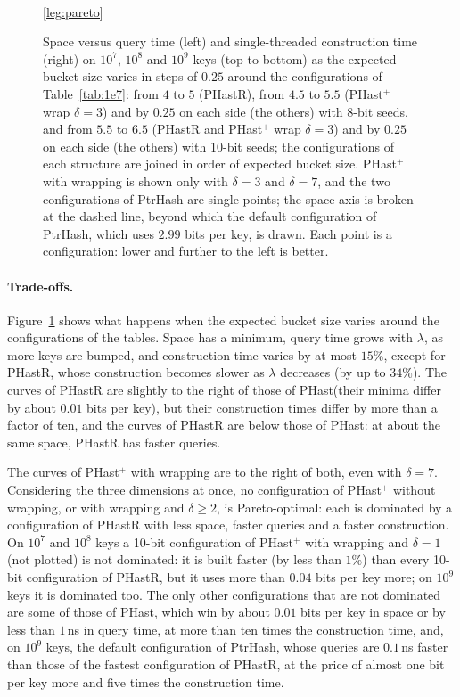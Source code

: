 \documentclass[11pt]{article}
\newcommand{\PHast}{PHast\xspace}
\newcommand{\PHastP}{PHast$^+$\xspace}
\newcommand{\PHastR}{PHastR\xspace}
\begin{document}
\begin{figure}[tp]
\\[1ex]
\ref{leg:pareto}
\caption{Space versus query time (left) and single-threaded construction time
(right) on $10^7$, $10^8$ and $10^9$ keys (top to bottom) as the expected
bucket size varies in steps of $0.25$ around the configurations of
Table~\ref{tab:1e7}: from $4$ to $5$ (\PHastR), from $4.5$ to $5.5$
(\PHastP wrap $\delta=3$) and by $0.25$ on each side (the others) with 8-bit
seeds, and from $5.5$ to $6.5$ (\PHastR and \PHastP wrap $\delta=3$) and by
$0.25$ on each side (the others) with 10-bit seeds; the configurations of
each structure are joined in order of expected bucket size. \PHastP with
wrapping is shown only with $\delta=3$ and $\delta=7$, and the two
configurations of PtrHash are single points; the space axis is broken at the
dashed line, beyond which the default configuration of PtrHash, which uses
$2.99$ bits per key, is drawn. Each point is a configuration: lower and
further to the left is better.}
\label{fig:pareto}
\end{figure}

\paragraph{Trade-offs.}
Figure~\ref{fig:pareto} shows what happens when the expected bucket size
varies around the configurations of the tables. Space has a minimum, query
time grows with $\lambda$, as more keys are bumped, and construction time
varies by at most $15\%$, except for \PHastR, whose construction becomes
slower as $\lambda$ decreases (by up to $34\%$). The curves of \PHastR are
slightly to the right of those of \PHast (their minima differ by about
$0.01$ bits per key), but their construction times differ by more than a
factor of ten, and the curves of \PHastR are below those of \PHast: at about
the same space, \PHastR has faster queries. 

The curves of \PHastP with
wrapping are to the right of both, even with $\delta=7$. Considering the
three dimensions at once, no configuration of \PHastP without wrapping, or
with wrapping and $\delta\geq2$, is Pareto-optimal: each is dominated by a
configuration of \PHastR with less space, faster queries and a faster
construction. On $10^7$ and $10^8$ keys a 10-bit configuration of \PHastP
with wrapping and $\delta=1$ (not plotted) is not dominated: it is built
faster (by less than $1\%$) than every 10-bit configuration of \PHastR, but
it uses more than $0.04$ bits per key more; on $10^9$ keys it is dominated
too. The only other configurations that are not dominated are some of those
of \PHast, which win by about $0.01$ bits per key in space or by less than
$1$\,ns in query time, at more than ten times the construction time, and, on
$10^9$ keys, the default configuration of PtrHash, whose queries are
$0.1$\,ns faster than those of the fastest configuration of \PHastR, at the
price of almost one bit per key more and five times the construction time.
\end{document}
